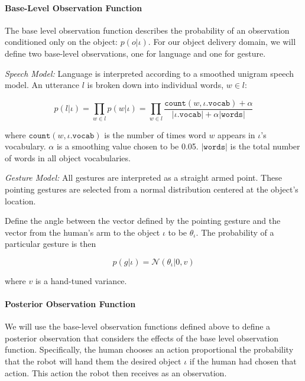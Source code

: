 \documentclass{article}
\begin{document}
\begin{multicols}{2}
\paragraph{Base-Level Observation Function} \label{baseobs}

The base level observation function describes the probability of an observation conditioned only on the object: $p(o|\iota)$. For our object delivery domain, we will define two base-level observations, one for language and one for gesture. 

\noindent\textit{Speech Model:} Language is interpreted according to a smoothed unigram speech model. An utterance $l$ is broken down into individual words, $w \in l$: 

\begin{equation}
	p(l|\iota) = \prod_{w \in l} p(w|\iota) = \prod_{w\in l} \frac{\texttt{count}(w, \iota.\texttt{vocab}) + \alpha}{|\iota.\texttt{vocab}| + \alpha |\texttt{words}|}
\end{equation}

where $\texttt{count}(w, \iota.\texttt{vocab})$ is the number of times word $w$ appears in $\iota$'s vocabulary. $\alpha$ is a smoothing value chosen to be 0.05.  $|\texttt{words}|$ is the total number of words in all object vocabularies. 

\noindent\textit{Gesture Model:} All gestures are interpreted as a straight armed point. These pointing gestures are selected from a normal distribution centered at the object's location. 

Define the angle between the vector defined by the pointing gesture and the vector from the human's arm to the object $\iota$ to be $\theta_\iota$. The probability of a particular gesture is then

\begin{equation}
p(g|\iota) = \mathcal{N}(\theta_\iota | 0, v)
\end{equation}

where $v$ is a hand-tuned variance. 

\paragraph{Posterior Observation Function}

We will use the base-level observation functions defined above to define a posterior observation that considers the effects of the base level observation function. Specifically, the human chooses an action proportional the probability that the robot will hand them the desired object $\iota$ if the human had chosen that action. This action the robot then receives as an observation. 


\end{multicols}
\end{document}

